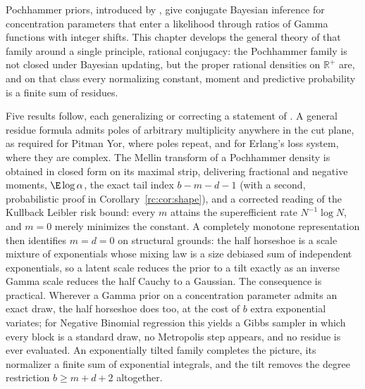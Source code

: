 \begin{chaptersummary}
Pochhammer priors, introduced by \citet{rc:wang2024}, give conjugate Bayesian inference for concentration parameters that enter a likelihood through ratios of Gamma functions with integer shifts. This chapter develops the general theory of that family around a single principle, rational conjugacy: the Pochhammer family is not closed under Bayesian updating, but the proper rational densities on $\mathbb{R}^+$ are, and on that class every normalizing constant, moment and predictive probability is a finite sum of residues.

Five results follow, each generalizing or correcting a statement of \citet{rc:wang2024}. A general residue formula admits poles of arbitrary multiplicity anywhere in the cut plane, as required for Pitman Yor, where poles repeat, and for Erlang's loss system, where they are complex. The Mellin transform of a Pochhammer density is obtained in closed form on its maximal strip, delivering fractional and negative moments, $\E\log\alpha$, the exact tail index $b-m-d-1$ (with a second, probabilistic proof in Corollary~\ref{rc:cor:shape}), and a corrected reading of the Kullback Leibler risk bound: every $m$ attains the superefficient rate $N^{-1}\log N$, and $m=0$ merely minimizes the constant. A completely monotone representation then identifies $m=d=0$ on structural grounds: the half horseshoe is a scale mixture of exponentials whose mixing law is a size debiased sum of independent exponentials, so a latent scale reduces the prior to a tilt exactly as an inverse Gamma scale reduces the half Cauchy to a Gaussian. The consequence is practical. Wherever a Gamma prior on a concentration parameter admits an exact draw, the half horseshoe does too, at the cost of $b$ extra exponential variates; for Negative Binomial regression this yields a Gibbs sampler in which every block is a standard draw, no Metropolis step appears, and no residue is ever evaluated. An exponentially tilted family completes the picture, its normalizer a finite sum of exponential integrals, and the tilt removes the degree restriction $b\ge m+d+2$ altogether.


\end{chaptersummary}
